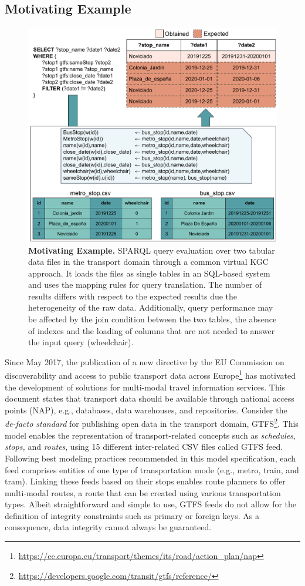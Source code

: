 \subsection{Motivating Example}
\begin{figure}[th]
    \centering
    \includegraphics[width=0.6\linewidth]{figures/example.pdf}
    \caption[Morph-CSV motivating example]{\textbf{Motivating Example.} SPARQL query evaluation over two tabular data files in the transport domain through a common virtual KGC approach. It loads the files as single tables in an SQL-based system and uses the mapping rules for query translation. The number of results differs with respect to the expected results due the heterogeneity of the raw data. Additionally, query performance may be affected by the join condition between the two tables, the absence of indexes and the loading of columns that are not needed to answer the input query (wheelchair).}
    \label{fig:example}
\end{figure}
Since May 2017, the publication of a new directive by the EU Commission on discoverability and access to public transport data across Europe\footnote{\url{https://ec.europa.eu/transport/themes/its/road/action_plan/nap}} has motivated the development of solutions for multi-modal travel information services. This document states that transport data should be available through national access points (NAP), e.g., databases, data warehouses, and repositories. Consider the \emph{de-facto standard} for publishing open data in the transport domain, GTFS\footnote{\url{https://developers.google.com/transit/gtfs/reference/}}. This model enables the representation of transport-related concepts such as \textit{schedules}, \textit{stops,} and \textit{routes}, using 15 different inter-related CSV files called GTFS feed. Following best modeling practices recommended in this model specification, each feed comprises entities of one type of transportation mode (e.g., metro, train, and tram). Linking these feeds based on their stops enables route planners to offer multi-modal routes, a route that can be created using various transportation types.
Albeit straightforward and simple to use, GTFS feeds do not allow for the definition of integrity constraints such as primary or foreign keys. As a consequence, data integrity cannot always be guaranteed. 

